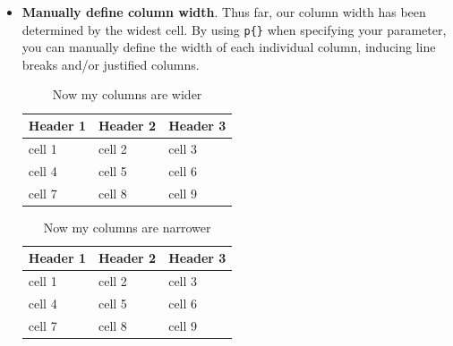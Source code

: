\documentclass[output=paper,colorlinks,citecolor=brown]{langscibook}
\begin{document}
\begin{itemize}
   
\item \textbf{Manually define column width}. Thus far, our column width has been determined by the widest cell. By using \verb|p{}| when specifying your parameter, you can manually define the width of each individual column, inducing line breaks and/or justified columns.

\begin{table} 
\caption{\large{Now my columns are wider}}
\centering
\begin{tabular}{p{1in}p{1in}p{1in}} %
\hline
\textbf{Header 1} & \textbf{Header 2} & \textbf{Header 3} \\
\hline\hline
cell 1 & cell 2 & cell 3 \\
\hline
cell 4 & cell 5 & cell 6 \\
\hline
cell 7 & cell 8 & cell 9 \\
\hline
\end{tabular}
\end{table}

\begin{table}[h!] 
\caption{\large{Now my columns are narrower}}
\centering
\begin{tabular}{p{1cm}p{1cm}p{1cm}} %
\hline
\textbf{Header 1} & \textbf{Header 2} & \textbf{Header 3} \\
\hline\hline
cell 1 & cell 2 & cell 3 \\
\hline
cell 4 & cell 5 & cell 6 \\
\hline
cell 7 & cell 8 & cell 9 \\
\hline
\end{tabular}
\end{table}





\end{itemize}
\end{document}
